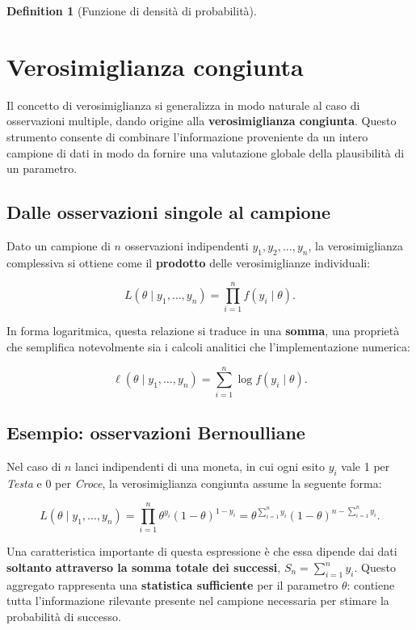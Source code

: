 \documentclass[
  letterpaper,
  DIV=11,
  numbers=noendperiod,
  oneside]{scrreprt}
\theoremstyle{definition}
\theoremstyle{plain}
\theoremstyle{definition}
\newtheorem{definition}{Definition}[chapter]
\theoremstyle{remark}
\begin{document}
\begin{definition}[Funzione di densità di
probabilità]
\section{Verosimiglianza congiunta}\label{verosimiglianza-congiunta}

Il concetto di verosimiglianza si generalizza in modo naturale al caso
di osservazioni multiple, dando origine alla \textbf{verosimiglianza
congiunta}. Questo strumento consente di combinare l'informazione
proveniente da un intero campione di dati in modo da fornire una
valutazione globale della plausibilità di un parametro.

\subsection{Dalle osservazioni singole al
campione}\label{dalle-osservazioni-singole-al-campione}

Dato un campione di \(n\) osservazioni indipendenti
\(y_1, y_2, \ldots, y_n\), la verosimiglianza complessiva si ottiene
come il \textbf{prodotto} delle verosimiglianze individuali:

\[
L(\theta \mid y_1, \ldots, y_n) = \prod_{i=1}^n f(y_i \mid \theta).
\]

In forma logaritmica, questa relazione si traduce in una \textbf{somma},
una proprietà che semplifica notevolmente sia i calcoli analitici che
l'implementazione numerica:

\[
\ell(\theta \mid y_1, \ldots, y_n) = \sum_{i=1}^n \log f(y_i \mid \theta).
\]

\subsection{Esempio: osservazioni
Bernoulliane}\label{esempio-osservazioni-bernoulliane}

Nel caso di \(n\) lanci indipendenti di una moneta, in cui ogni esito
\(y_i\) vale 1 per \emph{Testa} e 0 per \emph{Croce}, la verosimiglianza
congiunta assume la seguente forma:

\[
L(\theta \mid y_1, \ldots, y_n) = \prod_{i=1}^n \theta^{y_i}(1-\theta)^{1-y_i} = \theta^{\sum_{i=1}^n y_i}(1-\theta)^{n-\sum_{i=1}^n y_i}.
\]

Una caratteristica importante di questa espressione è che essa dipende
dai dati \textbf{soltanto attraverso la somma totale dei successi},
\(S_n = \sum_{i=1}^n y_i\). Questo aggregato rappresenta una
\textbf{statistica sufficiente} per il parametro \(\theta\): contiene
tutta l'informazione rilevante presente nel campione necessaria per
stimare la probabilità di successo.


\end{definition}
\end{document}
